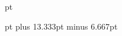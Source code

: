 \XrefSideAlignfalse
\ColNotesfalse
\XrefTopfillfalse


\def\FootNoteRuleLeftIndent{\hskip 0.00 mm}
\def\FootNoteRuleRightIndent{\hss}
\def\FootNoteRuleThickness{0.5 pt}
\def\FootNoteRuleWidth{1.00}
\def\BelowFootNoteRuleSpace{2.0 pt}
 pt

\def\StudyNoteRuleLeftIndent{\hskip 0.00 mm}
\def\StudyNoteRuleRightIndent{\hss}
\def\StudyNoteRuleThickness{0.5 pt}
\def\StudyNoteRuleWidth{1.00}
\def\BelowStudyNoteRuleSpace{2.0 pt}
 pt
\InterNoteSpace=3.5pt
\NoteGutterRulefalse
\JoinGutterRulefalse
\internoteskip=11.667pt plus 13.333pt minus 6.667pt


\def\HeaderPosition{0.835}
\def\FooterPosition{0.308}
\def\RangeSeparator{\kern.1em–\kern.1em} %
\def\ChapterVerseSeparator{\kern.02em:\kern.02em} %
\def\RangeChapSeparator{\kern.1em–\kern.1em}
\def\BookChapSeparator{\ }

\def\RHevenleft{\rangeref}
\def\RHevencenter{\pagenumber}
\def\RHevenright{\empty}

\def\RHoddleft{\empty}
\def\RHoddcenter{\pagenumber}
\def\RHoddright{\rangeref}

\def\RHnoVevenleft{\empty}
\def\RHnoVevencenter{\pagenumber}
\def\RHnoVevenright{\empty}

\def\RHnoVoddleft{\empty}
\def\RHnoVoddcenter{\pagenumber}
\def\RHnoVoddright{\empty}

\VerseRefsfalse               %
\OmitChapterNumberRHfalse   %
\OmitBookReffalse              %

